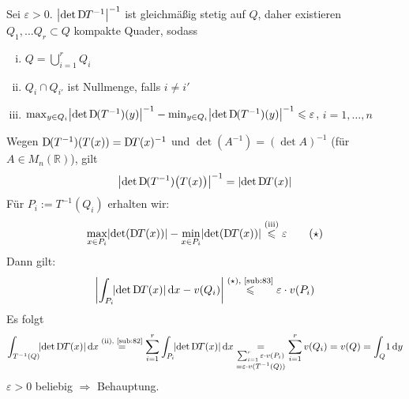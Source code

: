 Sei $\varepsilon>0$. $\abs*{\det \D T ^{-1}} ^{-1} $ ist gleichmäßig stetig auf $Q$, daher existieren $Q_1, \ldots Q_r \subset Q$ kompakte Quader, sodass 
\begin{enumerate}[(i)]
	\item $Q = \bigcup_{i=1}^r Q_i$
	\item $Q_i \cap Q_{i'}$ ist Nullmenge, falls $i \not= i'$
	\item $\max_{y \in Q_i} \abs*{\det \D (T ^{-1})(y)} ^{-1} - \min_{y \in Q_i} \abs*{\det \D (T ^{-1})(y)} ^{-1} \le \varepsilon$, \quad $i=1,\ldots ,n$
\end{enumerate}
Wegen $\D( T ^{-1})( T(x)) = \D T(x) ^{-1}$ und $\det (A ^{-1}) = (\det A) ^{-1}$ (für $A \in M_n(\mathds{R})$), gilt 
\[
	\abs*{\det \D (T ^{-1}) \big( T(x)\big) } ^{-1} =  \abs*{\det \D T(x)}
\]
Für $P_i := T ^{-1}(Q_i)$ erhalten wir: 
\[
	\max_{x \in P_i} \abs*{\det ( \D T(x))} - \min_{x \in P_i} \abs*{\det ( \D T(x))} \stackrel{\text{(iii)}}{\le} \varepsilon \tag{$\star$}
\]
Dann gilt:
\[
	\abs*{\int_{P_i}\! \abs*{\det \D T(x)}  \, \mathrm{d}x  - v(Q_i)} \stackrel{\text{($\star$), \ref{sub:83}}}{\le} \varepsilon \cdot v(P_i)
\]
Es folgt
\begin{align*}
	\int_{T ^{-1}(Q)}\! \abs*{\det \D T(x)}  \, \mathrm{d}x \stackrel{\text{(ii), \ref{sub:82}}}{=} \sum_{i=1}^{r} \int_{P_i}\! \abs*{\det \D T(x)}  \, \mathrm{d}x 
	\underset{\substack{\sum_{i=1}^{r} \varepsilon \cdot v(P_i) \\= \varepsilon \cdot v(T ^{-1}(Q)) }}{=} \sum_{i=1}^{r} v(Q_i) = v(Q) = \int_{Q} \! 1  \, \mathrm{d}y 
\end{align*}  
$\varepsilon>0$ beliebig $\Rightarrow $ Behauptung. \bewende

